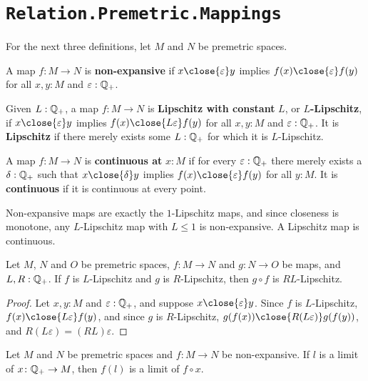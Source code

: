 \section{\texttt{Relation.Premetric.Mappings}}

For the next three definitions, let $M$ and $N$ be premetric spaces.

\begin{definition}
  \label{IsNonExpansive}
  A map $f \colon M \to N$ is \textbf{non-expansive} if $x \close{\varepsilon} y$ implies $f(x) \close{\varepsilon} f(y)$ for all $x, y : M$ and $\varepsilon : \mathbb{Q}_{+}$.
\end{definition}

\begin{definition}
  \label{IsLipschitzWith}
  Given $L : \mathbb{Q}_{+}$, a map $f \colon M \to N$ is \textbf{Lipschitz with constant} $L$, or \textbf{$L$-Lipschitz}, if $x \close{\varepsilon} y$ implies $f(x) \close{L \varepsilon} f(y)$ for all $x, y : M$ and $\varepsilon : \mathbb{Q}_{+}$. It is \textbf{Lipschitz} if there merely exists some $L : \mathbb{Q}_{+}$ for which it is $L$-Lipschitz.
\end{definition}

\begin{definition}
  \label{IsContinuousAt}
  A map $f \colon M \to N$ is \textbf{continuous at} $x : M$ if for every $\varepsilon : \mathbb{Q}_{+}$ there merely exists a $\delta : \mathbb{Q}_{+}$ such that $x \close{\delta} y$ implies $f(x) \close{\varepsilon} f(y)$ for all $y : M$. It is \textbf{continuous} if it is continuous at every point.
\end{definition}

Non-expansive maps are exactly the $1$-Lipschitz maps, and since closeness is monotone, any $L$-Lipschitz map with $L \le 1$ is non-expansive. A Lipschitz map is continuous.

\begin{lemma}
  \label{composeIsLipschitzWith}
  Let $M$, $N$ and $O$ be premetric spaces, $f \colon M \to N$ and $g \colon N \to O$ be maps, and $L, R : \mathbb{Q}_{+}$. If $f$ is $L$-Lipschitz and $g$ is $R$-Lipschitz, then $g \circ f$ is $RL$-Lipschitz.
\end{lemma}
\begin{proof}
  Let $x, y : M$ and $\varepsilon : \mathbb{Q}_{+}$, and suppose $x \close{\varepsilon} y$. Since $f$ is $L$-Lipschitz, $f(x) \close{L \varepsilon} f(y)$, and since $g$ is $R$-Lipschitz, $g(f(x)) \close{R (L \varepsilon)} g(f(y))$, and $R (L \varepsilon) = (RL) \varepsilon$.
\end{proof}

\begin{lemma}
  \label{NEPresLim}
  Let $M$ and $N$ be premetric spaces and $f \colon M \to N$ be non-expansive. If $l$ is a limit of $x \colon \mathbb{Q}_{+} \to M$, then $f(l)$ is a limit of $f \circ x$.
\end{lemma}
